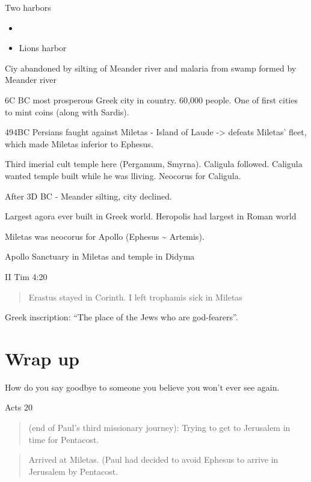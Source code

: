 \documentclass[
]{book}
\providecommand{\tightlist}{%
  \setlength{\itemsep}{0pt}\setlength{\parskip}{0pt}}
\begin{document}
Two harbors

\begin{itemize}
\tightlist
\item
\item
  Lions harbor
\end{itemize}

Ciy abandoned by silting of Meander river and malaria from swamp formed by Meander river

6C BC most prosperous Greek city in country. 60,000 people. One of first cities to mint coins (along with Sardis).

494BC Persians faught against Miletas - Island of Laude -\textgreater{} defeats Miletas' fleet, which made Miletas inferior to Ephesus.

Third imerial cult temple here (Pergamum, Smyrna). Caligula followed. Caligula wanted temple built while he was lliving. Neocorus for Caligula.

After 3D BC - Meander silting, city declined.

Largest agora ever built in Greek world. Heropolis had largest in Roman world

Miletas was neocorus for Apollo (Ephesus \textasciitilde{} Artemis).

Apollo Sanctuary in Miletas and temple in Didyma

II Tim 4:20

\begin{quote}
Erastus stayed in Corinth. I left trophamis sick in Miletas
\end{quote}

Greek inscription: ``The place of the Jews who are god-fearers''.

\hypertarget{wrap-up}{%
\chapter{Wrap up}\label{wrap-up}}

How do you say goodbye to someone you believe you won't ever see again.

Acts 20

\begin{quote}
(end of Paul's third missionary journey): Trying to get to Jerusalem in time for Pentacost.
\end{quote}

\begin{quote}
Arrived at Miletas. (Paul had decided to avoid Ephesus to arrive in Jerusalem by Pentacost.
\end{quote}
\end{document}

